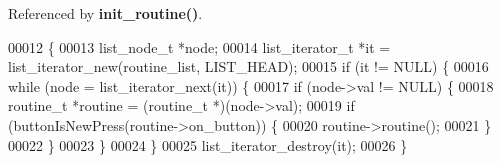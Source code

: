 Referenced by \textbf{ init\+\_\+routine()}.


\begin{DoxyCode}
00012                     \{
00013   list_node_t *node;
00014   list_iterator_t *it = list_iterator_new(routine_list, LIST_HEAD);
00015   \textcolor{keywordflow}{if} (it != NULL) \{
00016     \textcolor{keywordflow}{while} (node = list_iterator_next(it)) \{
00017       \textcolor{keywordflow}{if} (node->val != NULL) \{
00018         routine_t *routine = (routine_t *)(node->val);
00019         \textcolor{keywordflow}{if} (buttonIsNewPress(routine->on_button)) \{
00020           routine->routine();
00021         \}
00022       \}
00023     \}
00024   \}
00025   list_iterator_destroy(it);
00026 \}
\end{DoxyCode}
